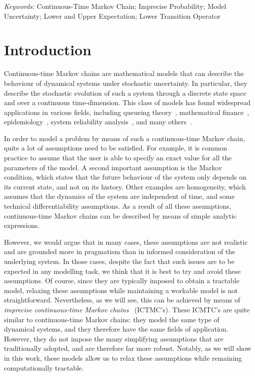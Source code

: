 \documentclass[10pt,a4paper]{paper}
\theoremstyle{definition}
\begin{document}
\noindent\emph{Keywords:} Continuous-Time Markov Chain; Imprecise Probability; Model Uncertainty; Lower and Upper Expectation; Lower Transition Operator


\newpage
\section{Introduction}\label{sec:introduction}

Continuous-time Markov chains are mathematical models that can describe the behaviour of dynamical systems under stochastic uncertainty. In particular, they describe the stochastic evolution of such a system through a discrete state space and over a continuous time-dimension. This class of models has found widespread applications in various fields, including queueing theory~\cite{asmussen2008applied,bolch2006queueing}, mathematical finance~\cite{elliott2013default, rolski2009stochastic,sass2004optimizing}, epidemiology~\cite{ duffy1995estimation,jackson2003multistate, lemey2009reconstructing}, system reliability analysis~\cite{besnard2010approach,gokhale2004analysis, wang2007reliability}, and many others~\cite{yin2012continuous}.

In order to model a problem by means of such a continuous-time Markov chain, quite a lot of assumptions need to be satisfied.
For example, it is common practice to assume that the user is able to specify an exact value for all the parameters of the model.
A second important assumption is the Markov condition, which states that the future behaviour of the system only depends on its current state, and not on its history. Other examples are homogeneity, which assumes that the dynamics of the system are independent of time, and some technical differentiability assumptions. 
As a result of all these assumptions, continuous-time Markov chains can be described by means of simple analytic expressions. 


However, we would argue that in many cases, these assumptions are not realistic and are grounded more in pragmatism than in informed consideration of the underlying system. In those cases, despite the fact that such issues are to be expected in any modelling task, we think that it is best to try and avoid these assumptions. Of course, since they are typically imposed to obtain a tractable model, relaxing these assumptions while maintaining a workable model is not straightforward. 
Nevertheless, as we will see, this can be achieved by means of \emph{imprecise continuous-time Markov chains}~\cite{Skulj:2015cq,troffaes2015using} (ICTMC's). These ICMTC's are quite similar to continuous-time Markov chains: they model the same type of dynamical systems, and they therefore have the same fields of application. However, they do not impose the many simplifying assumptions that are traditionally adopted, and are therefore far more robust. Notably, as we will show in this work, these models allow us to relax these assumptions while remaining computationally tractable.
\end{document}
